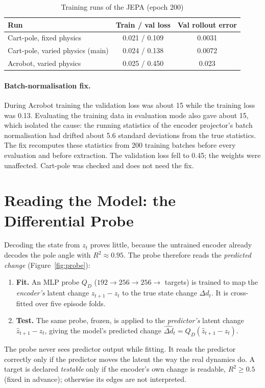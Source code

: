 \documentclass[11pt, a4paper, oneside,enumerate,textcomp]{report}
\newcommand{\zh}{\hat{z}}
\newcommand{\dd}{\Delta}
\newcommand{\Rsq}{R^2}
\begin{document}
\begin{table}[htbp]
\caption{Training runs of the JEPA (epoch 200)}
\centering
\small
\begin{tabular}{| p{5.2cm} | c | c |}
\hline
\textbf{Run} & \textbf{Train / val loss} & \textbf{Val rollout error} \\
\hline
Cart-pole, fixed physics & 0.021 / 0.109 & 0.0031 \\
\hline
Cart-pole, varied physics (main) & 0.024 / 0.138 & 0.0072 \\
\hline
Acrobot, varied physics & 0.025 / 0.450 & 0.023 \\
\hline
\end{tabular}
\label{tab:training}
\end{table}

\paragraph{Batch-normalisation fix.} During Acrobot training the validation loss was about 15 while the training loss was 0.13. Evaluating the training data in evaluation mode also gave about 15, which isolated the cause: the running statistics of the encoder projector's batch normalisation had drifted about 5.6 standard deviations from the true statistics. The fix recomputes these statistics from 200 training batches before every evaluation and before extraction. The validation loss fell to 0.45; the weights were unaffected. Cart-pole was checked and does not need the fix.

\section{Reading the Model: the Differential Probe}

Decoding the state from $z_t$ proves little, because the untrained encoder already decodes the pole angle with $\Rsq \approx 0.95$. The probe therefore reads the \emph{predicted change} (Figure~\ref{fig:probe}):
\begin{enumerate}
	\item \textbf{Fit.} An MLP probe $Q_D$ ($192 \rightarrow 256 \rightarrow 256 \rightarrow$ targets) is trained to map the \emph{encoder's} latent change $z_{t+1} - z_t$ to the true state change $\dd d_t$. It is cross-fitted over five episode folds.
	\item \textbf{Test.} The same probe, frozen, is applied to the \emph{predictor's} latent change $\zh_{t+1} - z_t$, giving the model's predicted change $\widehat{\dd d}_t = Q_D(\zh_{t+1} - z_t)$.
\end{enumerate}
The probe never sees predictor output while fitting. It reads the predictor correctly only if the predictor moves the latent the way the real dynamics do. A target is declared \emph{testable} only if the encoder's own change is readable, $\Rsq \geq 0.5$ (fixed in advance); otherwise its edges are not interpreted.
\end{document}
